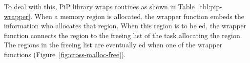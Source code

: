 To deal with this, PiP library wraps  routines as shown in
Table~\ref{tbl:pip-wrapper}. When a memory region is allocated, the
 wrapper function embeds the information who
allocates that region. When this region is to be ed, the
 wrapper function connects the region to the freeing
list of the task allocating the region. The regions in the freeing
list are eventually ed when one of the 
wrapper functions (Figure~\ref{fig:cross-malloc-free}).  
